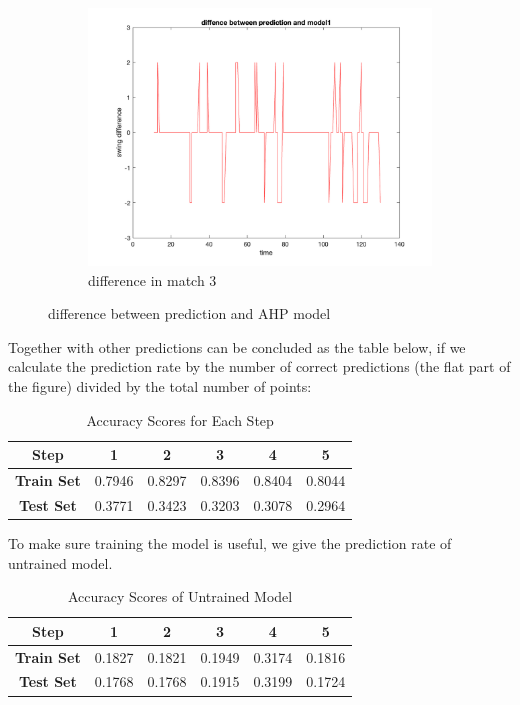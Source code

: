 \begin{figure}[H]
    \begin{subfigure}[b]{0.34\textwidth}
        \includegraphics[width=\linewidth]{mainmatter/imgs/swing_diff_match3_overfit.png}
        \caption{difference in match 3}
    \end{subfigure}
    \caption{difference between prediction and AHP model}
    \label{fig:diff swing}
\end{figure}

Together with other predictions can be concluded as the table below, 
if we calculate the prediction rate by the number of correct predictions (the flat part of the figure)
divided by the total number of points:

\begin{table}[H]
    \centering
    \begin{tabular}{cccccc}
        \toprule
        \textbf{Step} & \textbf{1} & \textbf{2} & \textbf{3} & \textbf{4} & \textbf{5} \\
        \midrule
        \textbf{Train Set} & 0.7946 & 0.8297 & 0.8396 & 0.8404 & 0.8044 \\
        \textbf{Test Set} & 0.3771 & 0.3423 & 0.3203 & 0.3078 & 0.2964 \\
        \bottomrule
    \end{tabular}
    \caption{Accuracy Scores for Each Step}
    \label{tab:predict_rate_untrained}
\end{table}

To make sure training the model is useful, we give the prediction rate of untrained model.

\begin{table}[H]
    \centering
    \begin{tabular}{cccccc}
        \toprule
        \textbf{Step} & \textbf{1} & \textbf{2} & \textbf{3} & \textbf{4} & \textbf{5} \\
        \midrule
        \textbf{Train Set} & 0.1827 & 0.1821 & 0.1949 & 0.3174 & 0.1816 \\
        \textbf{Test Set} & 0.1768 & 0.1768 & 0.1915 & 0.3199 & 0.1724 \\
        \bottomrule
    \end{tabular}
    \caption{Accuracy Scores of Untrained Model}
    \label{tab:predict_rate_untrained}
\end{table}


